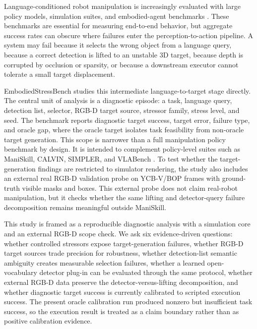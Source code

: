 Language-conditioned robot manipulation is increasingly evaluated with large policy models, simulation suites, and embodied-agent benchmarks \cite{shridhar2022cliport,jiang2023vima,brohan2023rt1,brohan2023rt2,openx2023}. These benchmarks are essential for measuring end-to-end behavior, but aggregate success rates can obscure where failures enter the perception-to-action pipeline. A system may fail because it selects the wrong object from a language query, because a correct detection is lifted to an unstable 3D target, because depth is corrupted by occlusion or sparsity, or because a downstream executor cannot tolerate a small target displacement.

EmbodiedStressBench studies this intermediate language-to-target stage directly. The central unit of analysis is a diagnostic episode: a task, language query, detection list, selector, RGB-D target source, stressor family, stress level, and seed. The benchmark reports diagnostic target success, target error, failure type, and oracle gap, where the oracle target isolates task feasibility from non-oracle target generation. This scope is narrower than a full manipulation policy benchmark by design. It is intended to complement policy-level suites such as ManiSkill, CALVIN, SIMPLER, and VLABench \cite{gu2021maniskill,gu2023maniskill2,mees2022calvin,li2024simpler,zhang2024vlabench}. To test whether the target-generation findings are restricted to simulator rendering, the study also includes an external real RGB-D validation probe on YCB-V/BOP frames with ground-truth visible masks and boxes. This external probe does not claim real-robot manipulation, but it checks whether the same lifting and detector-query failure decomposition remains meaningful outside ManiSkill.

This study is framed as a reproducible diagnostic analysis with a simulation core and an external RGB-D scope check. We ask six evidence-driven questions: whether controlled stressors expose target-generation failures, whether RGB-D target sources trade precision for robustness, whether detection-list semantic ambiguity creates measurable selection failures, whether a learned open-vocabulary detector plug-in can be evaluated through the same protocol, whether external RGB-D data preserve the detector-versus-lifting decomposition, and whether diagnostic target success is currently calibrated to scripted execution success. The present oracle calibration run produced nonzero but insufficient task success, so the execution result is treated as a claim boundary rather than as positive calibration evidence.

